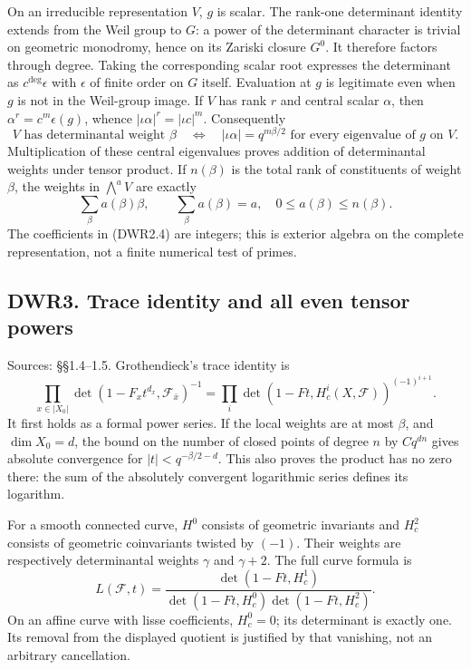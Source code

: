 On an irreducible representation \(V\), \(g\) is scalar. The rank-one
determinant identity extends from the Weil group to \(G\): a power of
the determinant character is trivial on geometric monodromy, hence on
its Zariski closure \(G^0\). It therefore factors through degree. Taking
the corresponding scalar root expresses the determinant as
\(c^{\deg}\epsilon\) with \(\epsilon\) of finite order on \(G\) itself.
Evaluation at \(g\) is legitimate even when \(g\) is not in the
Weil-group image. If \(V\) has rank \(r\) and central scalar \(\alpha\),
then \(\alpha^r=c^m\epsilon(g)\), whence
\(|\iota\alpha|^r=|\iota c|^m\). Consequently \[
V\text{ has determinantal weight }\beta
\quad\Longleftrightarrow\quad
|\iota\alpha|=q^{m\beta/2}\text{ for every eigenvalue of }g\text{ on }V.
\tag{DWR2.3}
\] Multiplication of these central eigenvalues proves addition of
determinantal weights under tensor product. If \(n(\beta)\) is the total
rank of constituents of weight \(\beta\), the weights in
\(\bigwedge^a V\) are exactly \[
\sum_\beta a(\beta)\beta,\qquad
\sum_\beta a(\beta)=a,\quad 0\le a(\beta)\le n(\beta).
\tag{DWR2.4}
\] The coefficients in (DWR2.4) are integers; this is exterior algebra
on the complete representation, not a finite numerical test of primes.

\subsection{DWR3. Trace identity and all even tensor
powers}\label{dwr3.-trace-identity-and-all-even-tensor-powers}

Sources: §§1.4--1.5. Grothendieck's trace identity is \[
\prod_{x\in|X_0|}\det(1-F_xt^{d_x},\mathcal F_{\bar x})^{-1}
=\prod_i\det(1-Ft,H_c^i(X,\mathcal F))^{(-1)^{i+1}}.
\tag{DWR3.1}
\] It first holds as a formal power series. If the local weights are at
most \(\beta\), and \(\dim X_0=d\), the bound on the number of closed
points of degree \(n\) by \(Cq^{dn}\) gives absolute convergence for
\(|t|<q^{-\beta/2-d}\). This also proves the product has no zero there:
the sum of the absolutely convergent logarithmic series defines its
logarithm.

For a smooth connected curve, \(H^0\) consists of geometric invariants
and \(H_c^2\) consists of geometric coinvariants twisted by \((-1)\).
Their weights are respectively determinantal weights \(\gamma\) and
\(\gamma+2\). The full curve formula is \[
L(\mathcal F,t)=
\frac{\det(1-Ft,H_c^1)}{\det(1-Ft,H_c^0)\det(1-Ft,H_c^2)}.
\tag{DWR3.2}
\] On an affine curve with lisse coefficients, \(H_c^0=0\); its
determinant is exactly one. Its removal from the displayed quotient is
justified by that vanishing, not an arbitrary cancellation.

